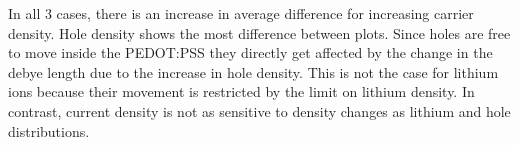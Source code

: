 \begin{doublespace}
In all 3 cases, there is an increase in average difference for increasing carrier density. Hole density shows the most difference between plots. Since holes are free to move inside the PEDOT:PSS they directly get affected by the change in the debye length due to the increase in hole density. This is not the case for lithium ions because their movement is restricted by the limit on lithium density. In contrast, current density is not as sensitive to density changes as lithium and hole distributions.



\end{doublespace}
